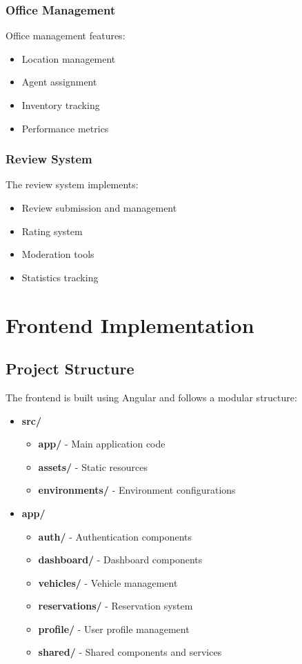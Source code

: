 \subsubsection{Office Management}
Office management features:

\begin{itemize}
    \item Location management
    \item Agent assignment
    \item Inventory tracking
    \item Performance metrics
\end{itemize}

\subsubsection{Review System}
The review system implements:

\begin{itemize}
    \item Review submission and management
    \item Rating system
    \item Moderation tools
    \item Statistics tracking
\end{itemize}

\section{Frontend Implementation}
\subsection{Project Structure}
The frontend is built using Angular and follows a modular structure:

\begin{itemize}
    \item \textbf{src/}
    \begin{itemize}
        \item \textbf{app/} - Main application code
        \item \textbf{assets/} - Static resources
        \item \textbf{environments/} - Environment configurations
    \end{itemize}
    
    \item \textbf{app/}
    \begin{itemize}
        \item \textbf{auth/} - Authentication components
        \item \textbf{dashboard/} - Dashboard components
        \item \textbf{vehicles/} - Vehicle management
        \item \textbf{reservations/} - Reservation system
        \item \textbf{profile/} - User profile management
        \item \textbf{shared/} - Shared components and services
    \end{itemize}
\end{itemize}

